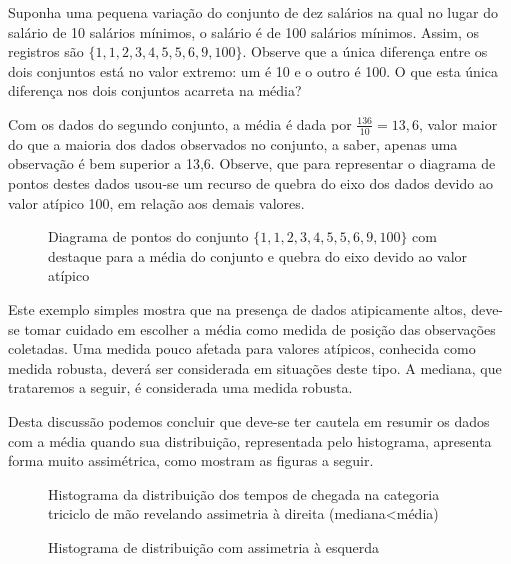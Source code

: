 Suponha uma pequena variação do conjunto de dez salários na qual no lugar do salário de 10 salários mínimos, o salário é de 100 salários mínimos. Assim, os registros são \(\{1, 1, 2, 3, 4, 5, 5, 6, 9, 100\}\).  Observe que a única diferença entre os dois conjuntos está no valor extremo: um é 10 e o outro é 100. O que esta única diferença nos dois conjuntos acarreta na média?

Com os dados do segundo conjunto, a média é dada por \(\frac{136}{10}=13,6\), valor maior do que a maioria dos dados observados no conjunto, a saber, apenas uma observação é bem superior a 13,6. Observe, que para representar o diagrama de pontos destes dados usou-se um recurso de quebra do eixo dos dados devido ao valor atípico 100, em relação aos demais valores.

\begin{figure}[H]
\centering
\capstart

\noindent{}
\caption{Diagrama de pontos do conjunto \(\{1, 1, 2, 3, 4, 5, 5, 6, 9, 100\}\) com destaque para a média do conjunto e quebra do eixo devido ao valor atípico}\label{\detokenize{PE104-1:fig-diagramadepontos-media-com-outlier}}\label{\detokenize{PE104-1:id13}}\end{figure}

Este exemplo simples mostra que na presença de dados atipicamente altos, deve-se tomar cuidado em escolher a média como medida de posição das observações coletadas. Uma medida pouco afetada para valores atípicos, conhecida como medida robusta,  deverá ser considerada em situações deste tipo. A mediana, que trataremos a seguir, é considerada uma medida robusta.

Desta discussão podemos concluir que deve-se ter cautela em resumir os dados com a média quando sua distribuição, representada pelo histograma, apresenta forma muito assimétrica, como mostram as figuras a seguir.

\begin{figure}[H]
\centering
\capstart

\noindent{}
\caption{Histograma da distribuição dos tempos de chegada na categoria triciclo de mão revelando assimetria à direita (mediana\textless{}média)}\label{\detokenize{PE104-1:fig-assimetriaadireita}}\label{\detokenize{PE104-1:id14}}\end{figure}

\begin{figure}[H]
\centering
\capstart

\noindent{}
\caption{Histograma de distribuição com assimetria à esquerda}\label{\detokenize{PE104-1:fig-assimetriaaesquerda}}\label{\detokenize{PE104-1:id15}}\end{figure}

